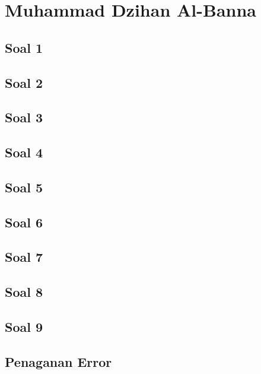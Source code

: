 \section{Muhammad Dzihan Al-Banna}
\subsection{Soal 1}
	
\subsection{Soal 2}
	
\subsection{Soal 3}
	
\subsection{Soal 4}
	
\subsection{Soal 5}
	
\subsection{Soal 6}
	
\subsection{Soal 7}
	
\subsection{Soal 8}
	
\subsection{Soal 9}
	
\subsection{Penaganan Error}
	

